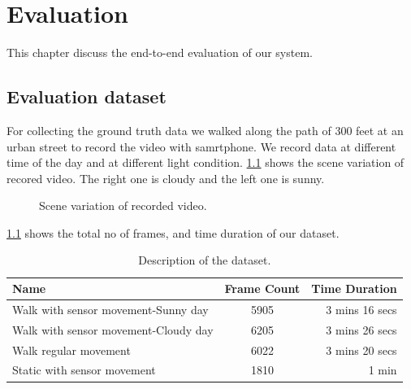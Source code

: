 \chapter{Evaluation}
\label{c:evalu}

This chapter discuss the end-to-end evaluation of our system.

\section{Evaluation dataset}
\label{s:eval}
For collecting the ground truth data we walked along the path of 300 feet at an urban street to record the video with samrtphone.
We record data at different time of the day and at different light condition.
\ref{f:dataset} shows the scene variation of recored video.
The right one is cloudy and the left one is sunny.

\begin{figure}[!ht]
\centering
{}
\hfill
{}

\caption{Scene variation of recorded video.}
\label{f:dataset}
\end{figure}

\ref{t:dataset} shows the total no of frames, and time duration of our dataset.

\begin{table}[h!]
  \centering
  \caption{Description of the dataset.}
  \label{t:dataset}
  \begin{tabular}{  l  c  r  }
   
    Name & Frame Count & Time Duration \\
    \hline
    Walk with sensor movement-Sunny day & 5905 & 3 mins 16 secs  \\
    Walk with sensor movement-Cloudy day & 6205 & 3 mins 26 secs \\
    Walk regular movement & 6022 & 3 mins 20 secs \\
    Static with sensor movement & 1810 & 1 min \\
    \hline
  \end{tabular}
\end{table}

